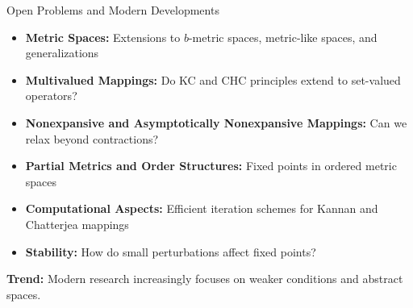 \documentclass[aspectratio=169,10pt]{beamer}
\begin{document}
\begin{frame}{Open Problems and Modern Developments}
    \begin{itemize}
        \item \textbf{Metric Spaces:} Extensions to $b$-metric spaces, metric-like spaces, and generalizations

        \item \textbf{Multivalued Mappings:} Do KC and CHC principles extend to set-valued operators?

        \item \textbf{Nonexpansive and Asymptotically Nonexpansive Mappings:}
        Can we relax beyond contractions?

        \item \textbf{Partial Metrics and Order Structures:} Fixed points in ordered metric spaces

        \item \textbf{Computational Aspects:} Efficient iteration schemes for Kannan and Chatterjea mappings

        \item \textbf{Stability:} How do small perturbations affect fixed points?
    \end{itemize}

    \vspace{0.3cm}
    \textbf{Trend:} Modern research increasingly focuses on weaker conditions and abstract spaces.
\end{frame}
\end{document}
